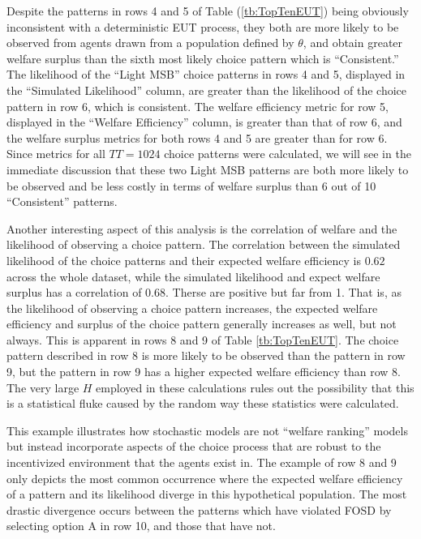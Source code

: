 \documentclass[../main.tex]{subfiles}
\begin{document}
Despite the patterns in rows 4 and 5 of Table (\ref{tb:TopTenEUT}) being obviously inconsistent with a deterministic EUT process, they both are more likely to be observed from agents drawn from a population defined by $\theta$, and obtain greater welfare surplus than the sixth most likely choice pattern which is \enquote{Consistent.}
The likelihood of the \enquote{Light MSB} choice patterns in rows 4 and 5, displayed in the \enquote{Simulated Likelihood} column, are greater than the likelihood of the choice pattern in row 6, which is consistent.
The welfare efficiency metric for row 5, displayed in the \enquote{Welfare Efficiency} column, is greater than that of row 6, and the welfare surplus metrics for both rows 4 and 5 are greater than for row 6.
Since metrics for all $TT = 1024$ choice patterns were calculated, we will see in the immediate discussion that these two Light MSB patterns are both more likely to be observed and be less costly in terms of welfare surplus than 6 out of 10 \enquote{Consistent} patterns.

\addtocounter{footnote}{-1}

Another interesting aspect of this analysis is the correlation of welfare and the likelihood of observing a choice pattern.
The correlation between the simulated likelihood of the choice patterns and their expected welfare efficiency is $0.62$ across the whole dataset, while the simulated likelihood and expect welfare surplus has a correlation of $0.68$.
Therse are positive but far from 1.
That is, as the likelihood of observing a choice pattern increases, the expected welfare efficiency and surplus of the choice pattern generally increases as well, but not always.
This is apparent in rows 8 and 9 of Table \ref{tb:TopTenEUT}.
The choice pattern described in row 8 is more likely to be observed than the pattern in row 9, but the pattern in row 9 has a higher expected welfare efficiency than row 8.
The very large $H$ employed in these calculations rules out the possibility that this is a statistical fluke caused by the random way these statistics were calculated.

This example illustrates how stochastic models are not \enquote{welfare ranking} models but instead incorporate aspects of the choice process that are robust to the incentivized environment that the agents exist in.
The example of row 8 and 9 only depicts the most common occurrence where the expected welfare efficiency of a pattern and its likelihood diverge in this hypothetical population.
The most drastic divergence occurs between the patterns which have violated FOSD by selecting option A in row 10, and those that have not.
\end{document}
